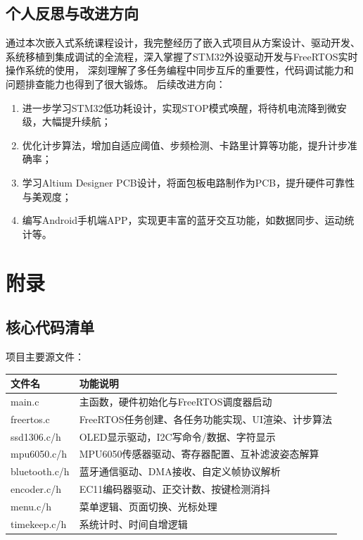 \documentclass[12pt, a4paper]{ctexart}
\begin{document}
\subsection{个人反思与改进方向}
通过本次嵌入式系统课程设计，我完整经历了嵌入式项目从方案设计、驱动开发、系统移植到集成调试的全流程，深入掌握了STM32外设驱动开发与FreeRTOS实时操作系统的使用，
深刻理解了多任务编程中同步互斥的重要性，代码调试能力和问题排查能力也得到了很大锻炼。
后续改进方向：
\begin{enumerate}
    \item 进一步学习STM32低功耗设计，实现STOP模式唤醒，将待机电流降到微安级，大幅提升续航；
    \item 优化计步算法，增加自适应阈值、步频检测、卡路里计算等功能，提升计步准确率；
    \item 学习Altium Designer PCB设计，将面包板电路制作为PCB，提升硬件可靠性与美观度；
    \item 编写Android手机端APP，实现更丰富的蓝牙交互功能，如数据同步、运动统计等。
\end{enumerate}

\section{附录}
\subsection{核心代码清单}
项目主要源文件：
\begin{table}[htbp]
\centering
\begin{tabular}{ll}
\toprule
文件名 & 功能说明 \\
\midrule
main.c & 主函数，硬件初始化与FreeRTOS调度器启动 \\
freertos.c & FreeRTOS任务创建、各任务功能实现、UI渲染、计步算法 \\
ssd1306.c/h & OLED显示驱动，I2C写命令/数据、字符显示 \\
mpu6050.c/h & MPU6050传感器驱动、寄存器配置、互补滤波姿态解算 \\
bluetooth.c/h & 蓝牙通信驱动、DMA接收、自定义帧协议解析 \\
encoder.c/h & EC11编码器驱动、正交计数、按键检测消抖 \\
menu.c/h & 菜单逻辑、页面切换、光标处理 \\
timekeep.c/h & 系统计时、时间自增逻辑 \\
\bottomrule
\end{tabular}
\end{table}
\end{document}
